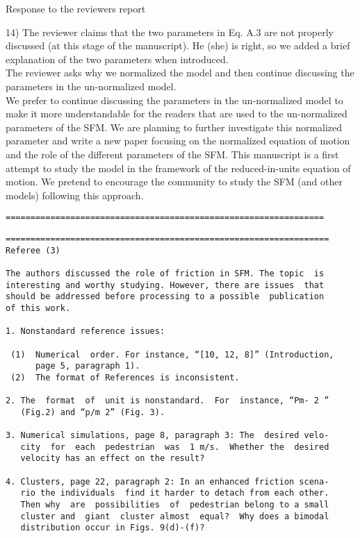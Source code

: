 \documentclass[a4paper,12pt]{letter}
\begin{document}
\begin{letter}{Response to the reviewers report}
{14) The reviewer claims that the two parameters in Eq. A.3 are not properly discussed (at this stage of the manuscript).
He (she) is right, so we added a brief explanation of the two parameters when introduced.\\

The reviewer asks why we normalized the model and then continue discussing the parameters in the un-normalized model.\\

We prefer to continue discussing the parameters in the un-normalized model to make it more understandable for the readers that are used to the un-normalized parameters of the SFM. We are planning to further investigate this normalized parameter and write a new paper focusing on the normalized equation of motion and the role of the different parameters of the SFM. This manuscript is a first attempt to study the model in the framework of the reduced-in-units equation of motion. We pretend to encourage the community to study the SFM (and other models) following this approach.


\begin{verbatim}
================================================================
\end{verbatim}

}

\newpage


\begin{verbatim}
=================================================================
Referee (3)

The authors discussed the role of friction in SFM. The topic  is 
interesting and worthy studying. However, there are issues  that 
should be addressed before processing to a possible  publication 
of this work.

1. Nonstandard reference issues:

 (1)  Numerical  order. For instance, “[10, 12, 8]” (Introduction,
      page 5, paragraph 1).
 (2)  The format of References is inconsistent.

2. The  format  of  unit is nonstandard.  For  instance, “Pm- 2 ”
   (Fig.2) and “p/m 2” (Fig. 3).

3. Numerical simulations, page 8, paragraph 3: The  desired velo-
   city  for  each  pedestrian  was  1 m/s.  Whether the  desired 
   velocity has an effect on the result?

4. Clusters, page 22, paragraph 2: In an enhanced friction scena-
   rio the individuals  find it harder to detach from each other.
   Then why  are  possibilities  of  pedestrian belong to a small 
   cluster and  giant  cluster almost  equal?  Why does a bimodal
   distribution occur in Figs. 9(d)-(f)?


\end{verbatim}
\end{letter}
\end{document}
